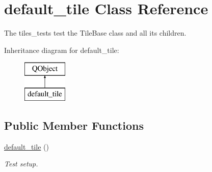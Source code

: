 \hypertarget{classdefault__tile}{\section{default\-\_\-tile Class Reference}
\label{classdefault__tile}
}


The tiles\-\_\-tests test the Tile\-Base class and all its children.  


Inheritance diagram for default\-\_\-tile\-:\begin{figure}[H]
\begin{center}
\leavevmode
\includegraphics[height=2.000000cm]{classdefault__tile}
\end{center}
\end{figure}
\subsection*{Public Member Functions}
\begin{DoxyCompactItemize}
\item 
\hyperlink{classdefault__tile_a95ff4527fa0b82da41b8ac27aa19b303}{default\-\_\-tile} ()
\begin{DoxyCompactList}\small\item\em Test setup. \end{DoxyCompactList}\end{DoxyCompactItemize}
